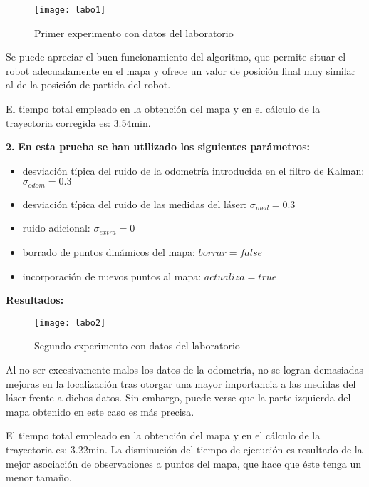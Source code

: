 \begin{figure}[h]
  \centering\texttt{[image: labo1]}\\
  \caption{Primer experimento con datos del laboratorio}\label{fg:labo1}
\end{figure}

Se puede apreciar el buen funcionamiento del algoritmo, que permite situar el robot adecuadamente en el mapa y ofrece un valor de posición final muy similar al de la posición de partida del robot.

El tiempo total empleado en la obtención del mapa y en el cálculo de la trayectoria corregida es: 3.54min.

\noindent
\textbf{2.} \textbf{En esta prueba se han utilizado los siguientes parámetros:}
\begin{itemize}
  \item desviación típica del ruido de la odometría introducida en el filtro de Kalman: $\sigma_{odom} = 0.3$
  \item desviación típica del ruido de las medidas del láser: $\sigma_{med} = 0.3$
  \item ruido adicional: $\sigma_{extra} = 0$
  \item borrado de puntos dinámicos del mapa: $borrar = false$
  \item incorporación de nuevos puntos al mapa: $actualiza = true$
\end{itemize}


\textbf{Resultados:}

\begin{figure}[h]
  \centering\texttt{[image: labo2]}\\
  \caption{Segundo experimento con datos del laboratorio}\label{fg:labo2}
\end{figure}

Al no ser excesivamente malos los datos de la odometría, no se logran demasiadas mejoras en la localización tras otorgar una mayor importancia a las medidas del láser frente a dichos datos. Sin embargo, puede verse que la parte izquierda del mapa obtenido en este caso es más precisa.

El tiempo total empleado en la obtención del mapa y en el cálculo de la trayectoria es: 3.22min. La disminución del tiempo de ejecución es resultado de la mejor asociación de observaciones a puntos del mapa, que hace que éste tenga un menor tamaño.

